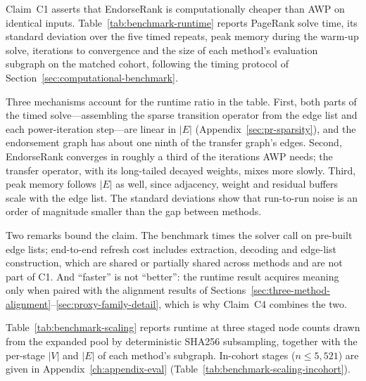 
Claim~C1 asserts that EndorseRank is computationally cheaper than AWP on identical inputs. Table~\ref{tab:benchmark-runtime} reports PageRank solve time, its standard deviation over the five timed repeats, peak memory during the warm-up solve, iterations to convergence and the size of each method's evaluation subgraph on the matched cohort, following the timing protocol of Section~\ref{sec:computational-benchmark}.



Three mechanisms account for the runtime ratio in the table. First, both parts of the timed solve---assembling the sparse transition operator from the edge list and each power-iteration step---are linear in $|E|$ (Appendix~\ref{sec:pr-sparsity}), and the endorsement graph has about one ninth of the transfer graph's edges. Second, EndorseRank converges in roughly a third of the iterations AWP needs; the transfer operator, with its long-tailed decayed weights, mixes more slowly. Third, peak memory follows $|E|$ as well, since adjacency, weight and residual buffers scale with the edge list. The standard deviations show that run-to-run noise is an order of magnitude smaller than the gap between methods.

Two remarks bound the claim. The benchmark times the solver call on pre-built edge lists; end-to-end refresh cost includes extraction, decoding and edge-list construction, which are shared or partially shared across methods and are not part of C1. And ``faster'' is not ``better'': the runtime result acquires meaning only when paired with the alignment results of Sections~\ref{sec:three-method-alignment}--\ref{sec:proxy-family-detail}, which is why Claim~C4 combines the two.


Table~\ref{tab:benchmark-scaling} reports runtime at three staged node counts drawn from the expanded pool by deterministic SHA256 subsampling, together with the per-stage $|V|$ and $|E|$ of each method's subgraph. In-cohort stages ($n\le 5{,}521$) are given in Appendix~\ref{ch:appendix-eval} (Table~\ref{tab:benchmark-scaling-incohort}).



